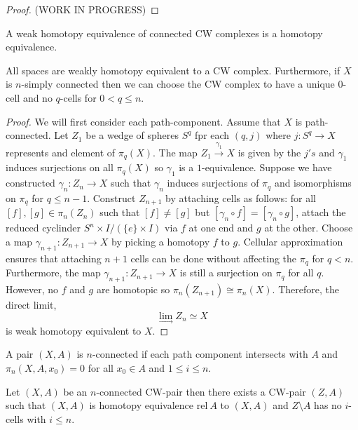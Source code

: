 \documentclass[12pt]{extarticle}
\begin{document}
\begin{proof}
(WORK IN PROGRESS)
\end{proof}

\begin{theorem}[Whitehead]
A weak homotopy equivalence of connected CW complexes is a homotopy equivalence. 
\end{theorem}

\begin{theorem}[CW approximation]
All spaces are weakly homotopy equivalent to a CW complex. Furthermore, if $X$ is $n$-simply connected then we can choose the CW complex to have a unique $0$-cell and no $q$-cells for $0 < q \le n$. 
\end{theorem}

\begin{proof}
We will first consider each path-component. Assume that $X$ is path-connected. Let $Z_1$ be a wedge of spheres $S^q$ fpr each $(q,j)$ where $j : S^q \to X$ represents and element of $\pi_q(X)$. The map $Z_1 \xrightarrow{\gamma_1} X$ is given by the $j's$ and $\gamma_1$ induces surjections on all $\pi_q(X)$ so $\gamma_1$ is a $1$-equivalence. Suppose we have constructed $\gamma_n : Z_n \to X$ such that $\gamma_n$ induces surjections of $\pi_q$ and isomorphisms on $\pi_q$ for $q \le n - 1$. Construct $Z_{n+1}$ by attaching cells as follows: for all $[f], [g] \in \pi_n(Z_n)$ such that $[f] \neq [g]$ but $[\gamma_n \circ f] = [\gamma_n \circ g]$, attach the reduced cyclinder $S^n \times I /(\{e\} \times I)$ via $f$ at one end and $g$ at the other. Choose a map $\gamma_{n + 1} : Z_{n+1} \to X$ by picking a homotopy $f$ to $g$. Cellular approximation ensures that attaching $n+1$ cells can be done without affecting the $\pi_q$ for $q < n$. Furthermore, the map $\gamma_{n+1} : Z_{n+1} \to X$ is still a surjection on $\pi_q$ for all $q$. However, no $f$ and $g$ are homotopic so $\pi_n(Z_{n+1}) \cong \pi_n(X)$. Therefore, the direct limit,
\[ \lim\limits_{\to} Z_n \simeq X\]
is weak homotopy equivalent to $X$.  
\end{proof}

\begin{definition}
A pair $(X, A)$ is $n$-connected if each path component intersects with $A$ and $\pi_n(X, A, x_0) = 0$ for all $x_0 \in A$ and $1 \le i \le n$. 
\end{definition}

\begin{corollary}
Let $(X, A)$ be an $n$-connected CW-pair then there exists a CW-pair $(Z, A)$ such that $(X, A)$ is homotopy equivalence $\mathrm{rel}\: A$ to $(X, A)$ and $Z \setminus A$ has no $i$-cells with $i \le n$.  
\end{corollary}
\end{document}
